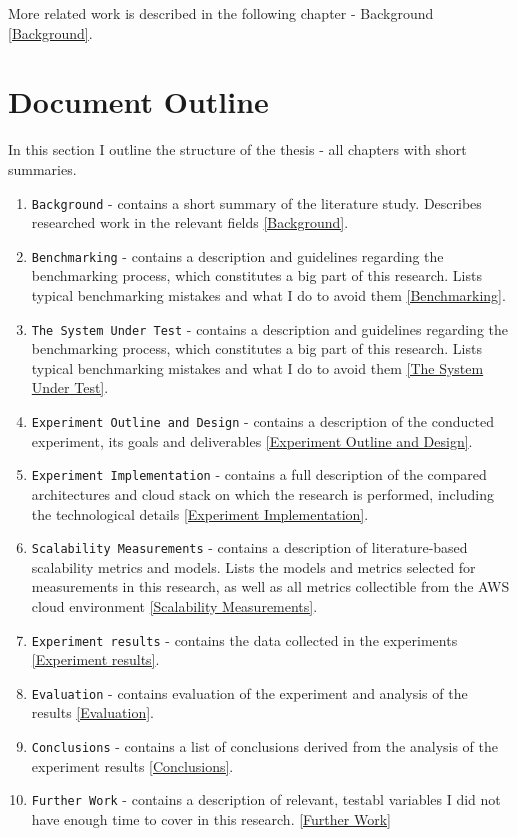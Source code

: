 \documentclass{uvamscse}
\begin{document}
More related work is described in the following chapter - Background \ref{Background}.

\section{Document Outline}
In this section I outline the structure of the thesis - all chapters with short summaries.

\begin{enumerate}
  \item \texttt{Background} - contains a short summary of the literature study. Describes researched work in the relevant fields \ref{Background}.
  \item \texttt{Benchmarking} - contains a description and guidelines regarding the benchmarking process, which constitutes a big part of this research. Lists typical benchmarking mistakes and what I do to avoid them \ref{Benchmarking}.
  \item \texttt{The System Under Test} - contains a description and guidelines regarding the benchmarking process, which constitutes a big part of this research. Lists typical benchmarking mistakes and what I do to avoid them \ref{The System Under Test}.
  \item \texttt{Experiment Outline and Design} - contains a description of the conducted experiment, its goals and deliverables \ref{Experiment Outline and Design}.
  \item \texttt{Experiment Implementation} - contains a full description of the compared architectures and cloud stack on which the research is performed, including the technological details \ref{Experiment Implementation}. 
  \item \texttt{Scalability Measurements} - contains a description of literature-based scalability metrics and models. Lists the models and metrics selected for measurements in this research, as well as all metrics collectible from the AWS cloud environment \ref{Scalability Measurements}.
  \item \texttt{Experiment results} - contains the data collected in the experiments \ref{Experiment results}.
  \item \texttt{Evaluation} - contains evaluation of the experiment and analysis of the results \ref{Evaluation}.
  \item \texttt{Conclusions} - contains a list of conclusions derived from the analysis of the experiment results \ref{Conclusions}.
  \item \texttt{Further Work} - contains a description of relevant, testabl variables I did not have enough time to cover in this research. \ref{Further Work}
\end{enumerate}
\end{document}
